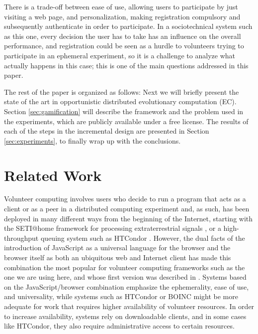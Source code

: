 \documentclass{llncs}
\begin{document}
There is a trade-off between ease of use, allowing users to
participate by just visiting a web page, and personalization, making
registration compulsory and subsequently authenticate in order to
participate. In a sociotechnical system such as this one, every
decision the user has to take has an influence on the overall
performance, and registration could be seen as a hurdle to volunteers
trying to participate in an ephemeral experiment, so it is a challenge
to analyze what actually happens in this case; this is one of the main
questions addressed in this paper.

The rest of the paper is organized as follows: Next we will briefly
present the state of the art in opportunistic distributed evolutionary
computation (EC). Section \ref{sec:gamification} will describe the
framework and the problem used in the experiments, which are publicly
available under a free license. The results of each of the steps in the incremental design are presented in Section
\ref{sec:experiments}, to finally wrap up with the conclusions.



\section{Related Work}
\label{sec:soa}

Volunteer computing involves users who decide to run a program that acts
as a client or as a peer in a distributed computing experiment
and, as such, has been deployed in many different ways from the
beginning of the Internet, starting with the SETI@home framework for
processing extraterrestrial signals \cite{david-seti:home}, or a
high-throughput queuing system such as HTCondor \cite{HTCondor}.
However,
the dual facts of the introduction of JavaScript as a universal language for the
browser and the browser itself as both an ubiquitous web and Internet client has
made this combination the most popular for volunteer computing
frameworks such as the one we are using here, and whose first version
was described in \cite{DBLP:conf/gecco/GuervosG15}. Systems based on the
JavaScript/browser combination
emphasize the ephemerality, ease of use, and universality, while
systems such as HTCondor or BOINC might be more adequate for work that %
requires higher availability of volunteer resources. In order to increase availability, systems rely on downloadable clients, and in some cases like HTCondor, they also require administrative access to certain resources.
\end{document}
